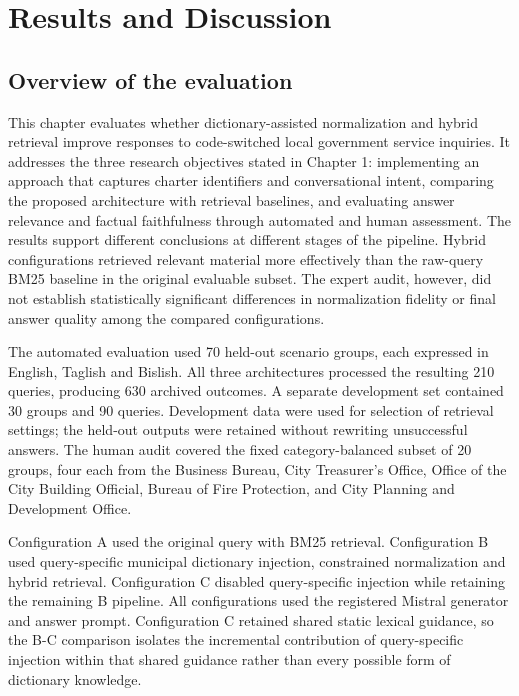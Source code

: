\chapter{Results and Discussion}

\section{Overview of the evaluation}

This chapter evaluates whether dictionary-assisted normalization and hybrid retrieval improve responses to code-switched local government service inquiries. It addresses the three research objectives stated in Chapter 1: implementing an approach that captures charter identifiers and conversational intent, comparing the proposed architecture with retrieval baselines, and evaluating answer relevance and factual faithfulness through automated and human assessment. The results support different conclusions at different stages of the pipeline. Hybrid configurations retrieved relevant material more effectively than the raw-query BM25 baseline in the original evaluable subset. The expert audit, however, did not establish statistically significant differences in normalization fidelity or final answer quality among the compared configurations.


The automated evaluation used 70 held-out scenario groups, each expressed in English, Taglish and Bislish. All three architectures processed the resulting 210 queries, producing 630 archived outcomes. A separate development set contained 30 groups and 90 queries. Development data were used for selection of retrieval settings; the held-out outputs were retained without rewriting unsuccessful answers. The human audit covered the fixed category-balanced subset of 20 groups, four each from the Business Bureau, City Treasurer's Office, Office of the City Building Official, Bureau of Fire Protection, and City Planning and Development Office.


Configuration A used the original query with BM25 retrieval. Configuration B used query-specific municipal dictionary injection, constrained normalization and hybrid retrieval. Configuration C disabled query-specific injection while retaining the remaining B pipeline. All configurations used the registered Mistral generator and answer prompt. Configuration C retained shared static lexical guidance, so the B-C comparison isolates the incremental contribution of query-specific injection within that shared guidance rather than every possible form of dictionary knowledge.


